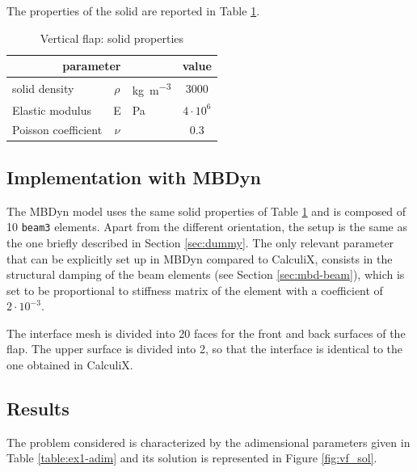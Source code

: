 The properties of the solid are reported in Table \ref{table:ex1-solid}.

\begin{table}[!htb]
	\begin{center}
		\begin{tabular}{ l c  l | c } 
			\multicolumn{3}{c|}{parameter} & value   \\ 
			\hline
			solid density  & $\rho$ & \si{kg.m^{-3}} & 3000    \\
			Elastic modulus  & E & \si{Pa} & $4\cdot 10^6$    \\
			Poisson coefficient & $\nu$ & & $0.3$  \\
		\end{tabular}
	\end{center}
	\caption{Vertical flap: solid properties}
	\label{table:ex1-solid}
\end{table}

 
\subsection{Implementation with MBDyn}


The MBDyn model uses the same solid properties of Table \ref{table:ex1-solid} and is composed of 10 \texttt{beam3} elements. Apart from the different orientation, the setup is the same as the one briefly described in Section \ref{sec:dummy}. The only relevant parameter that can be explicitly set up in MBDyn compared to CalculiX, consists in the structural damping of the beam elements (see Section \ref{sec:mbd-beam}), which is set to be proportional to stiffness matrix of the element with a coefficient of $2\cdot10^{-3}$.

The interface mesh is divided into 20 faces for the front and back surfaces of the flap. The upper surface is divided into 2, so that the interface is identical to the one obtained in CalculiX. 



\subsection{Results}

The problem considered is characterized by the adimensional parameters given in Table \ref{table:ex1-adim} and its solution is represented in Figure \ref{fig:vf_sol}.


